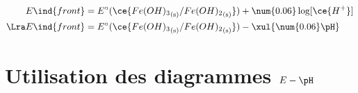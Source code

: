 \documentclass[a4paper, 10pt, landscape, twocolumn]{book}
\begin{document}
\begin{tcb*}[breakable]
\begin{enumerate}[label=\sqenumi]
\begin{itemize}
{				      \begin{align*}
					      E\ind{front} & =
					      E^\circ(\ce{{Fe(OH)_3}_{\rm(s)}/{Fe(OH)_2}_{\rm(s)}}) + \num{0.06}
					      \log [\ce{H^+}]
					      \\\Lra
					      E\ind{front} & =
					      E^\circ(\ce{{Fe(OH)_3}_{\rm(s)}/{Fe(OH)_2}_{\rm(s)}}) - \xul{\num{0.06}\pH}
				      \end{align*}
			      }%
			      \vspace{-15pt}
		\end{itemize}
	\end{enumerate}
	\begin{center}
	\end{center}
\end{tcb*}

\section{Utilisation des diagrammes $E-\pH$}
\label{sec:util}
\end{document}
